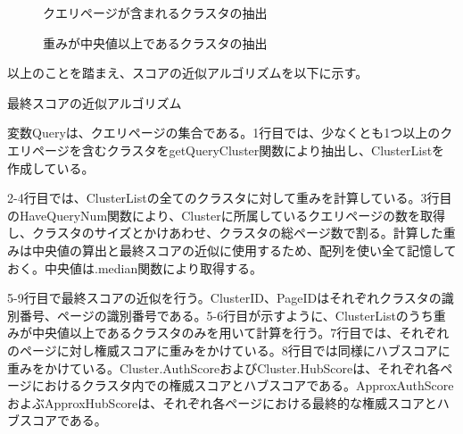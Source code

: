 \documentclass[a4paper,11pt]{jreport}
\begin{document}
\begin{figure}[htbp]
\begin{center}
\end{center}
\caption{クエリページが含まれるクラスタの抽出}
\label{figure:sample}
\end{figure}

\begin{figure}[htbp]
\begin{center}
\end{center}
\caption{重みが中央値以上であるクラスタの抽出}
\label{figure:sample}
\end{figure}

\newpage

以上のことを踏まえ、スコアの近似アルゴリズムを以下に示す。

\begin{algorithm}
\caption{最終スコアの近似アルゴリズム}
\begin{algorithmic}[1]

\ENDFOR
{}
\ENDIF
\ENDFOR
\end{algorithmic}
\end{algorithm}

変数Queryは、クエリページの集合である。1行目では、少なくとも1つ以上のクエリページを含むクラスタをgetQueryCluster関数により抽出し、ClusterListを作成している。

2-4行目では、ClusterListの全てのクラスタに対して重みを計算している。3行目のHaveQueryNum関数により、Clusterに所属しているクエリページの数を取得し、クラスタのサイズとかけあわせ、クラスタの総ページ数で割る。計算した重みは中央値の算出と最終スコアの近似に使用するため、配列を使い全て記憶しておく。中央値は.median関数により取得する。

5-9行目で最終スコアの近似を行う。ClusterID、PageIDはそれぞれクラスタの識別番号、ページの識別番号である。5-6行目が示すように、ClusterListのうち重みが中央値以上であるクラスタのみを用いて計算を行う。7行目では、それぞれのページに対し権威スコアに重みをかけている。8行目では同様にハブスコアに重みをかけている。Cluster.AuthScoreおよびCluster.HubScoreは、それぞれ各ページにおけるクラスタ内での権威スコアとハブスコアである。ApproxAuthScoreおよぶApproxHubScoreは、それぞれ各ページにおける最終的な権威スコアとハブスコアである。
\end{document}
